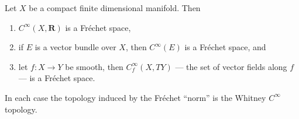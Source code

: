 Let $X$ be a compact finite dimensional manifold. Then
\begin{enumerate}
\item[(a)] $C^\infty(X, \mathbf{R})$ is a Fr\'{e}chet space,
\item[(b)] if $E$ is a vector bundle over $X$, then $C^\infty(E)$ is a Fr\'{e}chet space, and
\item[(c)] let $f: X \to Y$ be smooth, then $C_f^\infty(X, TY)$ --- the set of vector fields along $f$ --- is a Fr\'{e}chet space.
\end{enumerate}
In each case the topology induced by the Fr\'{e}chet ``norm'' is the Whitney $C^\infty$ topology.
